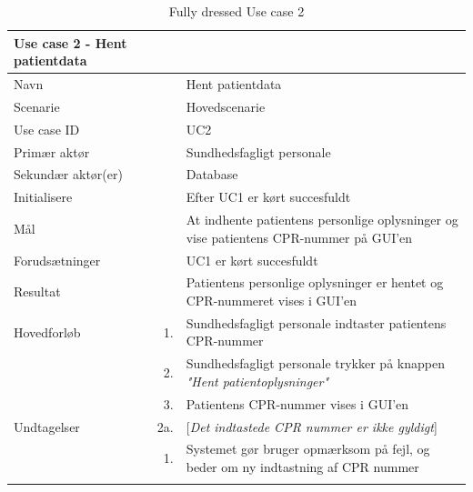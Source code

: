\begin{longtabu} to 
\toprule
    {\large \textbf{Use case 2 - Hent patientdata}} && \\
    \toprule
    Navn &&    Hent patientdata\\
    Scenarie &&    Hovedscenarie\\
    Use case ID &&    UC2\\
    Primær aktør &&    Sundhedsfagligt personale\\
    Sekundær aktør(er) &&    Database\\
    Initialisere &&    Efter UC1 er kørt succesfuldt\\
    Mål &&    At indhente patientens personlige oplysninger og vise patientens CPR-nummer på GUI'en\\
    Forudsætninger &&    UC1 er kørt succesfuldt\\
    Resultat &&    Patientens personlige oplysninger er hentet og CPR-nummeret vises i GUI'en\\
    \toprule
    Hovedforløb &    1. &    Sundhedsfagligt personale indtaster patientens CPR-nummer\\[-1ex]
    			&    2. &    Sundhedsfagligt personale trykker på knappen \textit{"Hent patientoplysninger"}\\[-1ex]
    			&	3.	&	Patientens CPR-nummer vises i GUI'en\\[-1ex]
    \toprule
    Undtagelser &    2a. &    [\textit{Det indtastede CPR nummer er ikke gyldigt}]\\[-1ex]
    &	1. &	Systemet gør bruger opmærksom på fejl, og beder om ny indtastning af CPR nummer\\[-1ex]
                \toprule
       
  
\caption{Fully dressed Use case 2}
\label{UC2}
\end{longtabu}
\newpage

